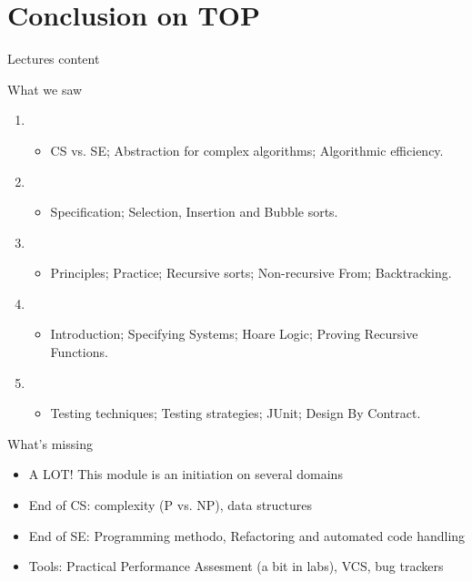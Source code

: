 \part{Conclusion on TOP}\mypartpage

\begin{frame}[squeeze]{Lectures content}
  \begin{block}{What we saw}
  \begin{enumerate}
  \item {}
    \begin{itemize}
    \item CS vs. SE; Abstraction for complex algorithms; Algorithmic efficiency.
    \end{itemize}

  \item {}
    \begin{itemize}
    \item Specification; Selection, Insertion and Bubble sorts.
    \end{itemize}

  \item {}
    \begin{itemize}
    \item Principles; Practice; Recursive sorts; Non-recursive From;
      Backtracking.
    \end{itemize}


  \item {}
    \begin{itemize}
    \item Introduction; Specifying Systems; Hoare Logic; Proving Recursive
      Functions. 
    \end{itemize}

  \item {}
    \begin{itemize}
    \item Testing techniques; Testing strategies; JUnit; Design By Contract.
    \end{itemize}
  \end{enumerate}    
  \end{block}

  \begin{block}{What's missing}
    \begin{itemize}
    \item A LOT! This module is an initiation on several domains
    \item End of CS: complexity (P vs. NP), data structures
    \item End of SE: Programming methodo, Refactoring and automated code
      handling
    \item Tools: Practical Performance Assesment (a bit in labs), VCS, bug
      trackers 
    \end{itemize}
  \end{block}
\end{frame}

